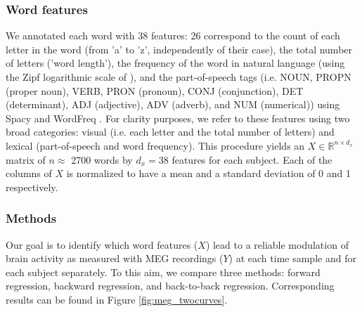 \subsubsection{Word features} We annotated each word with 38 features: 26
correspond to the count of each letter in the word (from 'a' to 'z',
independently of their case), the total number of letters ('word length'), the
frequency of the word in natural language (using the Zipf logarithmic scale
of \citep{van2014subtlex}), and the part-of-speech tags (i.e. NOUN, PROPN (proper
noun), VERB, PRON (pronoun), CONJ (conjunction), DET (determinant), ADJ
(adjective), ADV (adverb), and NUM (numerical)) using Spacy \citep{spacy2} and
WordFreq \citep{speerwordfreq}. For clarity purposes, we refer to these
features using two broad categories: visual (i.e. each letter and the total
number of letters) and lexical (part-of-speech and word frequency). This
procedure yields an $X \in \mathbb{R}^{n \times d_x}$ matrix of $n\approx$ 2700 words by
$d_x=38$ features for each subject. Each of the columns of $X$ is normalized to
have a mean and a standard deviation of 0 and 1 respectively.

\subsubsection{Methods}

Our goal is to identify which word features ($X$) lead to a reliable modulation of brain activity as measured with MEG recordings ($Y$) at each time sample and for each subject separately. To this aim,
we compare three methods: forward regression, backward regression, and back-to-back regression.
Corresponding results can be found in Figure \ref{fig:meg_twocurves}.

